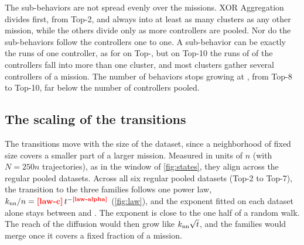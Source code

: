 \documentclass[pdflatex,sn-apa]{sn-jnl}
\begin{document}
\begin{table}[!htb]
\centering
\caption{Taxonomy of each dataset from the local grid: without labels, the modal count $\Cstar$, its modal region and
its stability; against the missions, the scores of the modal consensus and the settings without any misassigned run
(those in the modal region in parentheses).}
\label{tab:taxonomy}
\end{table}

The sub-behaviors are not spread evenly over the missions. XOR Aggregation divides first, from Top-2, and always into at
least as many clusters as any other mission, while the others divide only as more controllers are pooled. Nor do the
sub-behaviors follow the controllers one to one. A sub-behavior can be exactly the runs of one controller, as for
 on Top-, but on Top-10 the runs of  of the 
controllers fall into more than one cluster, and most clusters gather several controllers of a mission. The number of
behaviors stops growing at , from Top-8 to Top-10, far below the number of controllers pooled.

\subsection{The scaling of the transitions}
\label{sec:res_law}

The transitions move with the size of the dataset, since a neighborhood of fixed size covers a smaller part of a larger
mission. Measured in units of $n$ (with $N=250n$ trajectories), as in the window of \cref{fig:states}, they align across
the regular pooled datasets. Across all six regular pooled datasets (Top-2 to Top-7), the transition to the three
families follows one power law, $\knn/n=\nm{law-c}\,t^{-\nm{law-alpha}}$ (\cref{fig:law}), and the exponent fitted on
each dataset alone stays between  and . The exponent is close to the one half
of a random walk. The reach of the diffusion would then grow like $k_{\mathrm{nn}}\sqrt{t}$, and the families would merge once it
covers a fixed fraction of a mission.
\end{document}
